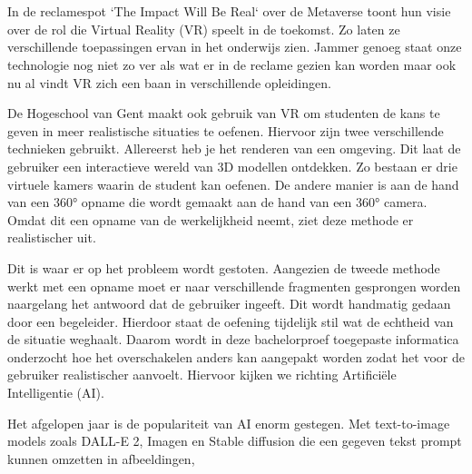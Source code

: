 
\chapter{}%
\label{ch:inleiding}

In de reclamespot `The Impact Will Be Real` over de Metaverse toont \textcite{Meta2022} hun visie over de rol die Virtual Reality (VR) speelt in de toekomst. Zo laten ze verschillende toepassingen ervan in het onderwijs zien. Jammer genoeg staat onze technologie nog niet zo ver als wat er in de reclame gezien kan worden maar ook nu al vindt VR zich een baan in verschillende opleidingen.

De Hogeschool van Gent maakt ook gebruik van VR om studenten de kans te geven in meer realistische situaties te oefenen. Hiervoor zijn twee verschillende technieken gebruikt. Allereerst heb je het renderen van een omgeving. Dit laat de gebruiker een interactieve wereld van 3D modellen ontdekken. Zo bestaan er drie virtuele kamers waarin de student kan oefenen. De andere manier is aan de hand van een 360° opname die wordt gemaakt aan de hand van een 360° camera. Omdat dit een opname van de werkelijkheid neemt, ziet deze methode er realistischer uit.

Dit is waar er op het probleem wordt gestoten. Aangezien de tweede methode werkt met een opname moet er naar verschillende fragmenten gesprongen worden naargelang het antwoord dat de gebruiker ingeeft. Dit wordt handmatig gedaan door een begeleider. Hierdoor staat de oefening tijdelijk stil wat de echtheid van de situatie weghaalt. Daarom wordt in deze bachelorproef toegepaste informatica onderzocht hoe het overschakelen anders kan aangepakt worden zodat het voor de gebruiker realistischer aanvoelt. Hiervoor kijken we richting Artificiële Intelligentie (AI).

Het afgelopen jaar is de populariteit van AI enorm gestegen. Met text-to-image models zoals DALL-E 2, Imagen en Stable diffusion die een gegeven tekst prompt kunnen omzetten in afbeeldingen,


